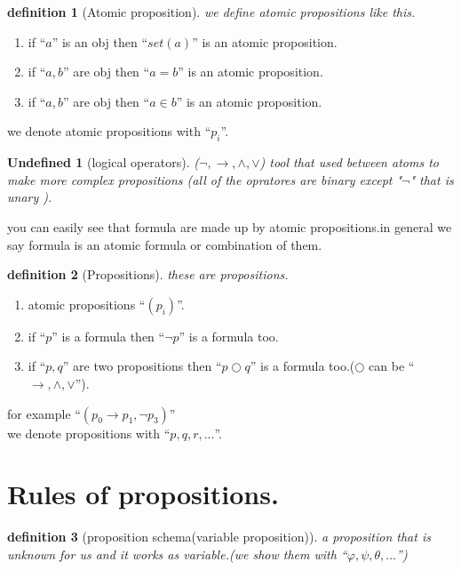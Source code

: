 \documentclass[10pt,a4paper]{book}
\newtheorem{undefined}{Undefined}[section]
\newtheorem{definition}{definition}[section]
\begin{document}
%
\begin{definition}[Atomic proposition] we define atomic propositions like this.
\end{definition}

\begin{enumerate}
    \setlength{\itemsep}{0pt} %
    \item if ``$a$'' is an obj then ``$set(a)$'' is an atomic proposition.
    \item if ``$a,b$'' are obj then ``$a=b$'' is an atomic proposition.
    \item if ``$a,b$'' are obj then ``$a \in b$'' is an atomic proposition.
\end{enumerate}
we denote atomic propositions with ``$p_{i}$''.

%
\begin{undefined}[logical operators] ($\neg ,\to ,\land ,\lor$) tool that used between
    atoms to make more complex propositions
    (all of the opratores are binary except "$\neg$" that is unary ).
\end{undefined}

you can easily see that formula are made up by atomic propositions.in general
we say formula is an atomic formula or combination of them.

%
\begin{definition}[Propositions] these are propositions.
\end{definition}

\begin{enumerate}
    \setlength{\itemsep}{0pt} %
    \item atomic propositions ``$(p_{i})$''.
    \item if ``$p$'' is a formula then ``$\neg p$'' is a formula too.
    \item if ``$p ,q$'' are two propositions then ``$p \bigcirc q $'' is a formula
          too.($\bigcirc $ can be ``$\to,\land ,\lor$'').
\end{enumerate}

for example ``$(p_0 \to p_1 ,\neg p_3)$'' \\
we denote propositions with ``$p ,q ,r ,...$''.

\section{Rules of propositions.}

\begin{definition}[proposition schema(variable proposition)] a proposition that is unknown
    for us and it works as variable.(we show them with ``$\varphi ,\psi ,\theta ,... $'')
\end{definition}
\end{document}
